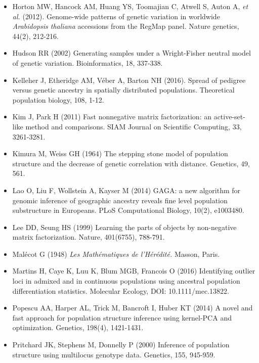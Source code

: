\begin{itemize}
\item[] Horton MW, Hancock AM, Huang YS, Toomajian C, Atwell S, Auton A, {\it et al.} (2012). Genome-wide patterns of genetic variation in worldwide {\it Arabidopsis thaliana} accessions from the RegMap panel. Nature genetics, 44(2), 212-216.

\item[] Hudson RR (2002) Generating samples under a Wright-Fisher neutral model of genetic variation. Bioinformatics, 18, 337-338.

\item[] Kelleher J, Etheridge AM, V\'eber A, Barton NH (2016). Spread of pedigree versus genetic ancestry in spatially distributed populations. Theoretical population biology, 108, 1-12.

\item[] Kim J, Park H (2011) Fast nonnegative matrix factorization: an active-set-like method and comparisons. SIAM Journal on Scientific Computing, 33, 3261-3281.

\item[] Kimura M, Weiss GH (1964) The stepping stone model of population structure and the decrease of genetic correlation with distance. Genetics, 49, 561.

\item[] Lao O, Liu F, Wollstein A,  Kayser M (2014) GAGA: a new algorithm for genomic inference of geographic ancestry reveals fine level population substructure in Europeans. PLoS Computational Biology, 10(2), e1003480.

\item[] Lee DD, Seung HS (1999) Learning the parts of objects by non-negative matrix factorization. Nature, 401(6755), 788-791.

\item[] Mal\'ecot G (1948) {\it Les Math\'ematiques de l'H\'er\'edit\'e.} Masson, Paris.

\item[] Martins H, Caye K, Luu K,  Blum MGB, Francois O (2016) Identifying outlier loci in admixed and in continuous populations using ancestral population differentiation statistics. Molecular Ecology, DOI: 10.1111/mec.13822. 

\item[] Popescu AA, Harper AL, Trick M, Bancroft I,  Huber KT (2014) A novel and fast approach for population structure inference using kernel-PCA and optimization. Genetics, 198(4), 1421-1431.

\item[] Pritchard JK, Stephens M, Donnelly P (2000) Inference of population structure using multilocus genotype data. Genetics, 155, 945-959.


\end{itemize}
